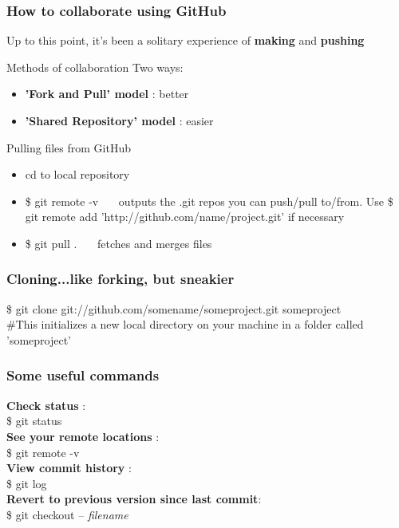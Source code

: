 \documentclass{beamer}\usepackage{graphicx, color}
\begin{document}
\begin{frame}
\frametitle{How to collaborate using GitHub}
Up to this point, it's been a solitary experience of \textbf{making} and \textbf{pushing} \\
 \begin{block}{Methods of collaboration}
Two ways:
\begin{itemize}
 \item \textbf{'Fork and Pull' model} : better
 \item \textbf{'Shared Repository' model} : easier
\end{itemize}
\end{block}
\pause

\begin{alertblock}{Pulling files from GitHub}
 \begin{itemize}
  \item cd to local repository
  \item \$ git remote -v  \ \ \  outputs the .git repos you can push/pull to/from. Use \$ git remote add 'http://github.com/name/project.git' if necessary
  \item \$ git pull . \ \ \ fetches and merges files
 \end{itemize}
\end{alertblock}
\end{frame}






\begin{frame}
 \frametitle{Cloning...like forking, but sneakier}

 \$ git clone git://github.com/somename/someproject.git someproject \\
\vspace{1cm}
\#This initializes a new local directory on your machine in a folder called 'someproject' \\

\end{frame}


\begin{frame}
 \frametitle{Some useful commands}

\textbf{Check status} : \\ \$ git status \vspace{0.5cm} \\
    \pause
\textbf{See your remote locations} : \\ \$ git remote -v \vspace{0.5cm} \\
    \pause
\textbf{View commit history} : \\ \$ git log \vspace{0.5cm} \\
    \pause
\textbf{Revert to previous version since last commit}:  \\ \$ git checkout -- \textit{filename} 

\end{frame}
\end{document}
